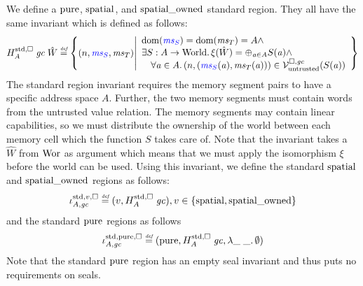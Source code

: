 \begin{jversion}
We define a $\pure$, $\spatial$, and $\spatialo$ standard region. They all have the same invariant which is defined as follows:
\[
  H_A^{\mathrm{std},\square} \; \gc \; \hat{W} \defeq \left\{ \npair{\src{\ms_S},\ms_T} \middle|
    \begin{array}{l}
      \dom(\src{\ms_S}) = \dom(\ms_T) = A \wedge \\
      \exists S : A \fun \World \ldotp \xi(\hat{W}) = \oplus_{\aaddr \in A} S(\aaddr) \wedge\\ 
      \quad \forall \aaddr \in A \ldotp \npair{(\src{\ms_S}(\aaddr),\ms_T(\aaddr))} \in \lrv(S(\aaddr))
    \end{array}
  \right\}
\]
The standard region invariant requires the memory segment pairs to have a specific address space $A$.
Further, the two memory segments must contain words from the untrusted value relation.
The memory segments may contain linear capabilities, so we must distribute the ownership of the world between each memory cell which the function $S$ takes care of.
Note that the invariant takes a $\hat{W}$ from $\Wor$ as argument which means that we must apply the isomorphism $\xi$ before the world can be used.
Using this invariant, we define the standard $\spatial$ and $\spatialo$ regions as follows:
\[
  \stdreg{A,\gc}{v} \defeq (v,H_A^{\mathrm{std},\square} \; \gc) , v \in \{\spatial,\spatialo\}
\]
and the standard $\pure$ regions as follows
\[
  \stdreg{A,\gc}{\pure} \defeq (\pure,H_A^{\mathrm{std},\square} \; \gc, \lambda \_ \; \_ \ldotp \emptyset)
\]
Note that the standard $\pure$ region has an empty seal invariant and thus puts no requirements on seals.


\end{jversion}

